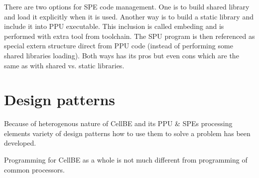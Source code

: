 \par
There are two options for SPE code management. One is to build shared library and load it explicitly when it is used. Another way is to build a static library and include it into PPU executable. This inclusion is called embeding and is performed with extra tool from toolchain. The SPU program is then referenced as special extern structure direct from PPU code (instead of performing some shared libraries loading). Both ways has its pros but even cons which are the same as with shared vs. static libraries.

\section {Design patterns}

\par
Because of heterogenous nature of CellBE and its PPU \& SPEs processing elements variety of design patterns how to use them to solve a problem has been developed.

Programming for CellBE as a whole is not much different from programming of common processors. 